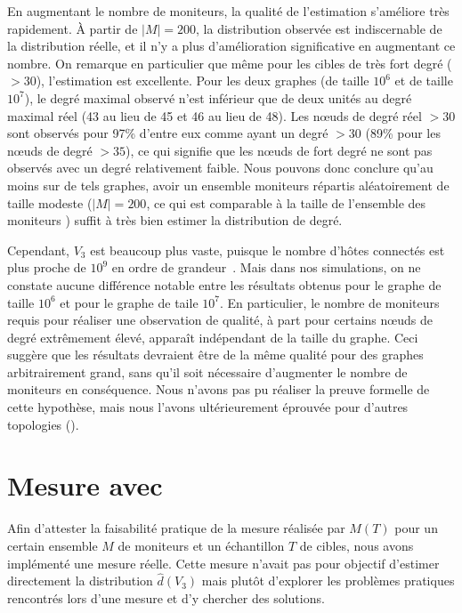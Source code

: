 En augmentant le nombre de moniteurs, la qualité de l'estimation s'améliore très
rapidement. À partir de $|M| = 200$, la distribution observée est indiscernable
de la distribution réelle, et il n'y a plus d'amélioration significative en
augmentant ce nombre. On remarque en particulier que même pour les cibles de
très fort degré ($> 30$), l'estimation est excellente. Pour les deux graphes (de
taille $10^6$ et de taille $10^7$), le degré maximal observé n'est inférieur que
de deux unités au degré maximal réel (43 au lieu de 45 et 46 au lieu de 48).
Les n\oe{}uds de degré réel $>30$ sont observés pour 97\% d'entre eux comme ayant
un degré $>30$ (89\% pour les n\oe{}uds de degré $>35$), ce qui signifie que les
n\oe{}uds de fort degré ne sont pas observés avec un degré relativement faible.
Nous pouvons donc conclure qu'au moins sur de tels graphes, avoir un ensemble
moniteurs répartis aléatoirement de taille modeste ($|M| = 200$, ce qui est
comparable à la taille de l'ensemble des moniteurs \planetlab) suffit à très
bien estimer la distribution de degré.

Cependant, $V_3$ est \apriori beaucoup plus vaste, puisque le nombre d'hôtes
connectés est plus proche de $10^9$ en ordre de
grandeur~\cite{consotium2010isc}. Mais dans nos simulations, on ne constate
aucune différence notable entre les résultats obtenus pour le graphe de
taille $10^6$ et pour le graphe de taile $10^7$. En particulier, le nombre de
moniteurs requis pour réaliser une observation de qualité, à part pour certains
n\oe{}uds de degré extrêmement élevé, apparaît indépendant de la taille du graphe.
Ceci suggère que les résultats devraient être de la même qualité pour des
graphes arbitrairement grand, sans qu'il soit nécessaire d'augmenter le nombre
de moniteurs en conséquence. Nous n'avons pas pu réaliser la preuve formelle de
cette hypothèse, mais nous l'avons ultérieurement éprouvée pour d'autres
topologies ().

\section{Mesure avec \planetlab}
\label{sec:traceroute-measurement}

Afin d'attester la faisabilité pratique de la mesure réalisée par $M(T)$ pour un
certain ensemble $M$ de moniteurs et un échantillon $T$ de cibles, nous
avons implémenté une mesure réelle. Cette mesure n'avait pas pour objectif d'estimer
directement la distribution $\hat{d}(V_3)$ mais plutôt d'explorer les problèmes
pratiques rencontrés lors d'une mesure et d'y chercher des solutions.

